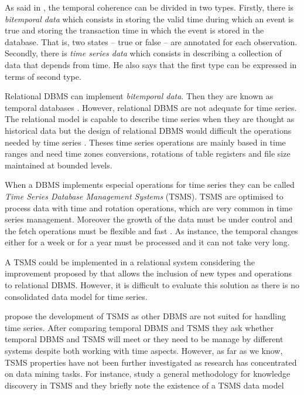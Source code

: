 As said in \textcite{assfalg08:thesis}, the temporal coherence can be divided in two types. Firstly, there is  \emph{bitemporal data} which consists in storing the valid time during which an event is true and storing the transaction time in which the event is stored in the database. That is, two states -- true or false -- are annotated for each observation.  Secondly, there is \emph{time series data} which consists in describing a collection of data that depends from time. He also says that the first type can be expressed in terms of second type.

Relational DBMS can implement \emph{bitemporal data}. Then they are known as temporal databases \parencite[ch.\ 22]{date}. However, relational DBMS are not adequate for time series. The relational model is capable to describe time series when they are thought as historical data but the design of relational DBMS would difficult the operations  needed by time series \parencite{schmidt95}. Theses time series operations are mainly based in time ranges and need time zones conversions, rotations of table registers and file size maintained at bounded levels.

When a DBMS implements especial operations for time series they can be called \emph{Time Series Database Management Systems} (TSMS). TSMS are optimised to process data with time and rotation operations, which are very common in time series management. Moreover the growth of the data must be under control and the fetch operations must be flexible and fast \parencite{keogh10:isax}. As instance, the temporal changes either for a week or for a year must be processed and it can not take very long.

A TSMS could be implemented in a relational system considering the improvement proposed by \textcite{stonebraker86} that allows the inclusion of new types and operations to relational DBMS. However, it is difficult to evaluate this solution as there is no consolidated data model  for time series. 

\textcite{dreyer94} propose the development of TSMS as other DBMS are not suited for handling time series.  After comparing temporal DBMS and TSMS \parencite{schmidt95} they ask whether temporal DBMS and TSMS will meet or they need to be manage by different systems despite both working with time aspects.
However, as far as we know, TSMS properties have not been further investigated as research has concentrated on data mining tasks. For instance, \textcite{last01} study a  general methodology for knowledge discovery in TSMS and they briefly note the existence of a TSMS data model  %






